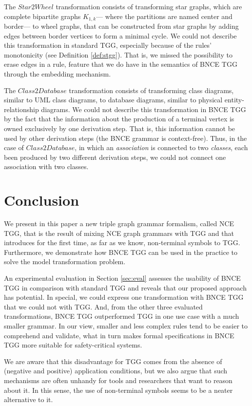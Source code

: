 \documentclass[runningheads]{llncs}
\begin{document}
The $Star2Wheel$ transformation consists of transforming star graphs, which are complete bipartite graphs $K_{1,k}$--- where the partitions are named center and border--- to wheel graphs, that can be constructed from star graphs by adding edges between border vertices to form a minimal cycle. We could not describe this transformation in standard TGG, especially because of the rules' monotonicity (see Definition \ref{def:stgg}). That is, we missed the possibility to erase edges in a rule, feature that we do have in the semantics of BNCE TGG through the embedding mechanism.

The $Class2Database$ transformation consists of transforming class diagrams, similar to UML class diagrams, to database diagrams, similar to physical entity-relationship diagrams. We could not describe this transformation in BNCE TGG by the fact that the information about the production of a terminal vertex is owned exclusively by one derivation step. That is, this information cannot be used by other derivation steps (the BNCE grammar is context-free). Thus, in the case of $Class2Database$, in which an \textit{association} is connected to two \textit{classes}, each been produced by two different derivation steps, we could not connect one association with two classes.

\section{Conclusion}
\label{sec:conclusion}
We present in this paper a new triple graph grammar formalism, called NCE TGG, that is the result of mixing NCE graph grammars \cite{janssens1982graph} with TGG \cite{schurr1994specification} and that introduces for the first time, as far as we know, non-terminal symbols to TGG. Furthermore, we demonstrate how BNCE TGG can be used in the practice to solve the model transformation problem.

An experimental evaluation in Section \ref{sec:eval} assesses the usability of BNCE TGG in comparison with standard TGG and reveals that our proposed approach has potential. In special, we could express one transformation with BNCE TGG that we could not with TGG. And, from the other three evaluated transformations, BNCE TGG outperformed TGG in one use case with a much smaller grammar. In our view, smaller and less complex rules tend to be easier to comprehend and validate, what in turn makes formal specifications in BNCE TGG more suitable for safety-critical systems.

We are aware that this disadvantage for TGG comes from the absence of (negative and positive) application conditions, but we also argue that such mechanisms are often unhandy for tools and researchers that want to reason about it. In this sense, the use of non-terminal symbols seems to be a neater alternative to it.
\end{document}
